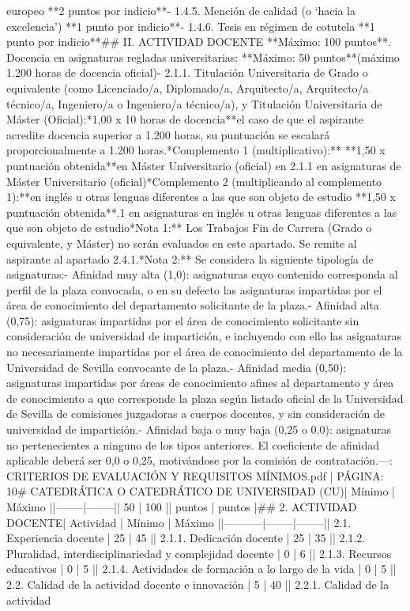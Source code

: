 \documentclass{article}
\begin{document}
\begin{itemize}
{{europeo                   **2 puntos por indicio**\n- 1.4.5. Mención de calidad (o ‘hacia la excelencia’)        **1 punto por indicio**\n- 1.4.6. Tesis en régimen de cotutela                        **1 punto por indicio**\n\n## II. ACTIVIDAD DOCENTE                                                                     **Máximo: 100 puntos**\n{}. Docencia en asignaturas regladas universitarias:                                     **Máximo: 50 puntos**\n(máximo 1.200 horas de docencia oficial)\n- 2.1.1. Titulación Universitaria de Grado o equivalente (como Licenciado/a, Diplomado/a, Arquitecto/a, Arquitecto/a técnico/a, Ingeniero/a o Ingeniero/a técnico/a), y Titulación Universitaria de Máster (Oficial):\n**1,00 x 10 horas de docencia**\nEn el caso de que el aspirante acredite docencia superior a 1.200 horas, su puntuación se escalará proporcionalmente a 1.200 horas.\n\n**Complemento 1 (multiplicativo):**                             **1,50 x puntuación obtenida**\nDocencia en Máster Universitario (oficial)                  en 2.1.1 en asignaturas de Máster Universitario (oficial)\n\n**Complemento 2 (multiplicando al complemento 1):**\nDocencia en inglés u otras lenguas diferentes a las que son objeto de estudio                                      **1,50 x puntuación obtenida**.1 en asignaturas en inglés u otras lenguas diferentes a las que son objeto de estudio\n\n**Nota 1:** Los Trabajos Fin de Carrera (Grado o equivalente, y Máster) no serán evaluados en este apartado. Se remite al aspirante al apartado 2.4.1.\n**Nota 2:** Se considera la siguiente tipología de asignaturas:\n- Afinidad muy alta (1,0): asignaturas cuyo contenido corresponda al perfil de la plaza convocada, o en su defecto las asignaturas impartidas por el área de conocimiento del departamento solicitante de la plaza.\n- Afinidad alta  (0,75): asignaturas impartidas por el área de conocimiento solicitante sin consideración de universidad de impartición, e incluyendo con ello las asignaturas no necesariamente impartidas por el área de conocimiento del departamento de la Universidad de Sevilla convocante de la plaza.\n- Afinidad media  (0,50): asignaturas impartidas por áreas de conocimiento afines al departamento y área de conocimiento a que corresponde la plaza según listado oficial de la Universidad de Sevilla de comisiones juzgadoras a cuerpos docentes, y sin consideración de universidad de impartición.\n- Afinidad baja o muy baja      (0,25 o 0,0): asignaturas no pertenecientes a ninguno de los tipos anteriores. El coeficiente de afinidad aplicable deberá ser 0,0 o 0,25, motivándose por la comisión de contratación.\n\n---\n\nFUENTE: CRITERIOS DE EVALUACIÓN Y REQUISITOS MÍNIMOS.pdf | PÁGINA: 10\n# CATEDRÁTICA O CATEDRÁTICO DE UNIVERSIDAD (CU)\n\n| Mínimo | Máximo |\n|--------|--------|\n| 50     | 100    |\n| puntos | puntos |\n\n## 2. ACTIVIDAD DOCENTE\n\n| Actividad | Mínimo | Máximo |\n|-----------|--------|--------|\n| 2.1. Experiencia docente | 25 | 45 |\n| 2.1.1. Dedicación docente | 25 | 35 |\n| 2.1.2. Pluralidad, interdisciplinariedad y complejidad docente | 0 | 6 |\n| 2.1.3. Recursos educativos | 0 | 5 |\n| 2.1.4. Actividades de formación a lo largo de la vida | 0 | 5 |\n| 2.2. Calidad de la actividad docente e innovación | 5 | 40 |\n| 2.2.1. Calidad de la actividad }}
\end{itemize}
\end{document}

